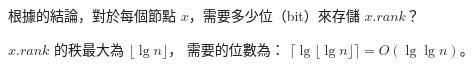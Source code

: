 \startEXERCISE
根據\inexercise[19.4-2] 的結論，對於每個節點 $x$，需要多少位（bit）來存儲 $x.rank$？
\stopEXERCISE

\startANSWER
$x.rank$ 的秩最大為 $\lfloor \lg n\rfloor$，
需要的位數為： $\lceil \lg \lfloor \lg n\rfloor \rceil = O(\lg\lg n)$。
\stopANSWER